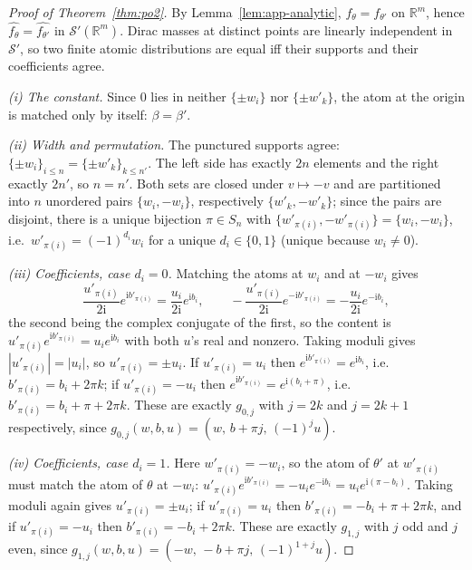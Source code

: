 \documentclass[10pt,letterpaper]{article}
\theoremstyle{definition}
\newcommand{\R}{\mathbb{R}}
\begin{document}
\begin{proof}[Proof of Theorem~\ref{thm:po2}]
By Lemma~\ref{lem:app-analytic}, $f_\theta = f_{\theta'}$ on $\R^m$, hence
$\widehat{f_\theta} = \widehat{f_{\theta'}}$ in $\mathcal S'(\R^m)$. Dirac masses at distinct
points are linearly independent in $\mathcal S'$, so two finite atomic distributions are equal iff
their supports and their coefficients agree.

\emph{(i) The constant.} Since $0$ lies in neither $\{\pm w_i\}$ nor $\{\pm w'_k\}$, the atom at
the origin is matched only by itself: $\beta = \beta'$.

\emph{(ii) Width and permutation.} The punctured supports agree:
$\{\pm w_i\}_{i\le n} = \{\pm w'_k\}_{k \le n'}$. The left side has exactly $2n$ elements and the
right exactly $2n'$, so $n = n'$. Both sets are closed under $v \mapsto -v$ and are partitioned
into $n$ unordered pairs $\{w_i,-w_i\}$, respectively $\{w'_k,-w'_k\}$; since the pairs are
disjoint, there is a unique bijection $\pi \in S_n$ with
$\{w'_{\pi(i)}, -w'_{\pi(i)}\} = \{w_i, -w_i\}$, i.e.\ $w'_{\pi(i)} = (-1)^{d_i} w_i$ for a unique
$d_i \in \{0,1\}$ (unique because $w_i \neq 0$).

\emph{(iii) Coefficients, case $d_i = 0$.} Matching the atoms at $w_i$ and at $-w_i$ gives
\[
\frac{u'_{\pi(i)}}{2\mathrm i}e^{\mathrm i b'_{\pi(i)}} = \frac{u_i}{2\mathrm i}e^{\mathrm i b_i},
\qquad
-\frac{u'_{\pi(i)}}{2\mathrm i}e^{-\mathrm i b'_{\pi(i)}} = -\frac{u_i}{2\mathrm i}e^{-\mathrm i b_i},
\]
the second being the complex conjugate of the first, so the content is
$u'_{\pi(i)} e^{\mathrm i b'_{\pi(i)}} = u_i e^{\mathrm i b_i}$ with both $u$'s real and nonzero.
Taking moduli gives $|u'_{\pi(i)}| = |u_i|$, so $u'_{\pi(i)} = \pm u_i$. If $u'_{\pi(i)} = u_i$
then $e^{\mathrm i b'_{\pi(i)}} = e^{\mathrm i b_i}$, i.e.\ $b'_{\pi(i)} = b_i + 2\pi k$; if
$u'_{\pi(i)} = -u_i$ then $e^{\mathrm i b'_{\pi(i)}} = e^{\mathrm i (b_i + \pi)}$, i.e.\
$b'_{\pi(i)} = b_i + \pi + 2\pi k$. These are exactly $g_{0,j}$ with $j = 2k$ and $j = 2k+1$
respectively, since $g_{0,j}(w,b,u) = (w,\, b + \pi j,\, (-1)^j u)$.

\emph{(iv) Coefficients, case $d_i = 1$.} Here $w'_{\pi(i)} = -w_i$, so the atom of $\theta'$ at
$w'_{\pi(i)}$ must match the atom of $\theta$ at $-w_i$:
$u'_{\pi(i)}e^{\mathrm i b'_{\pi(i)}} = -u_i e^{-\mathrm i b_i} = u_i e^{\mathrm i(\pi - b_i)}$.
Taking moduli again gives $u'_{\pi(i)} = \pm u_i$; if $u'_{\pi(i)} = u_i$ then
$b'_{\pi(i)} = -b_i + \pi + 2\pi k$, and if $u'_{\pi(i)} = -u_i$ then
$b'_{\pi(i)} = -b_i + 2\pi k$. These are exactly $g_{1,j}$ with $j$ odd and $j$ even, since
$g_{1,j}(w,b,u) = (-w,\, -b + \pi j,\, (-1)^{1+j}u)$.


\end{proof}
\end{document}
